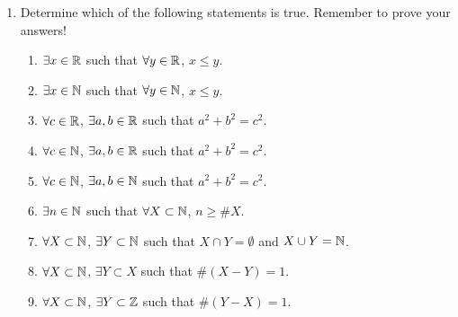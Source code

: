 \probsec{~\ref{sec:open-statements}}
\begin{enumerate}
    \item Determine which of the following statements is true. Remember to prove your answers!
  \begin{enumerate}
      \item $\exists x \in \mathbb{R}$ such that $\forall y \in \mathbb{R}$, $x \leq y$.
      \item $\exists x \in \mathbb{N}$ such that $\forall y \in \mathbb{N}$, $x \leq y$.
      \item $\forall c \in \mathbb{R}$, $\exists a, b \in \mathbb{R}$ such that $a^2 + b^2 = c^2$.
      \item $\forall c \in \mathbb{N}$, $\exists a, b \in \mathbb{R}$ such that $a^2 + b^2 = c^2$.
      \item $\forall c \in \mathbb{N}$, $\exists a, b \in \mathbb{N}$ such that $a^2 + b^2 = c^2$.
      \item $\exists n \in \mathbb{N}$ such that $\forall X \subset \mathbb{N}$, $n \geq \# X$.
      \item $\forall X \subset \mathbb{N}$, $\exists Y \subset \mathbb{N}$ such that $X \cap Y = \emptyset$ and $X \cup Y = \mathbb{N}$.
      \item $\forall X \subset \mathbb{N}$, $\exists Y \subset X$ such that $\# (X - Y) = 1$.
      \item $\forall X \subset \mathbb{N}$, $\exists Y \subset \mathbb{Z}$ such that $\# (Y - X) = 1$.
  \end{enumerate}

\end{enumerate}
